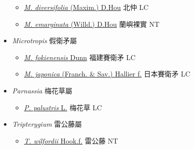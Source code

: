 \begin{itemize}
  \begin{itemize}
        \item[] \href{http://www.theplantlist.org/tpl1.1/search?q=Maytenus+diversifolia}{\textit{M. diversifolia} (Maxim.) D.Hou}   北仲 LC
        \item[] \href{http://www.theplantlist.org/tpl1.1/search?q=Maytenus+emarginata}{\textit{M. emarginata} (Willd.) D.Hou}   蘭嶼裸實 NT
  \end{itemize}
 \item[] \textit{Microtropis} 假衛矛屬
                    
  \begin{itemize}
        \item[] \href{http://www.theplantlist.org/tpl1.1/search?q=Microtropis+fokienensis}{\textit{M. fokienensis} Dunn}   福建賽衛矛 LC
        \item[] \href{http://www.theplantlist.org/tpl1.1/search?q=Microtropis+japonica}{\textit{M. japonica} (Franch. \& Sav.) Hallier f.}   日本賽衛矛 LC
  \end{itemize}
 \item[] \textit{Parnassia} 梅花草屬
                    
  \begin{itemize}
        \item[] \href{http://www.theplantlist.org/tpl1.1/search?q=Parnassia+palustris}{\textit{P. palustris} L.}   梅花草 LC
  \end{itemize}
 \item[] \textit{Tripterygium} 雷公藤屬
                    
  \begin{itemize}
        \item[] \href{http://www.theplantlist.org/tpl1.1/search?q=Tripterygium+wilfordii}{\textit{T. wilfordii} Hook.f.}   雷公藤 NT
  \end{itemize}
  \end{itemize}
